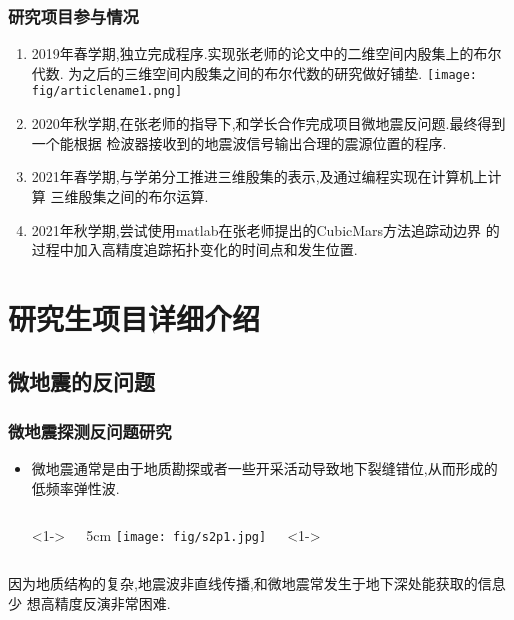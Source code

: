 \documentclass[UTF8]{ctexbeamer}	%
\theoremstyle{plain}
\theoremstyle{definition}
\theoremstyle{remark}
\numberwithin{equation}{section}
\begin{document}
\begin{frame}[fragile]
   \frametitle{研究项目参与情况}
    \small{\begin{enumerate}
        \item 2019年春学期,独立完成程序.实现张老师的论文中的二维空间内殷集上的布尔代数.
        为之后的三维空间内殷集之间的布尔代数的研究做好铺垫.
        \texttt{[image: fig/articlename1.png]}
        \item 2020年秋学期,在张老师的指导下,和学长合作完成项目微地震反问题.最终得到一个能根据
        检波器接收到的地震波信号输出合理的震源位置的程序.
        \item 2021年春学期,与学弟分工推进三维殷集的表示,及通过编程实现在计算机上计算
        三维殷集之间的布尔运算.
        \item 2021年秋学期,尝试使用matlab在张老师提出的CubicMars方法追踪动边界
        的过程中加入高精度追踪拓扑变化的时间点和发生位置.
    \end{enumerate}}
\end{frame}

\section{研究生项目详细介绍}
\subsection{微地震的反问题}

\begin{frame}[fragile]
    \frametitle{微地震探测反问题研究}
    \begin{itemize}
        \item  微地震通常是由于地质勘探或者一些开采活动导致地下裂缝错位,从而形成的
        低频率弹性波.
        \begin{columns}
            <1->
            \begin{wrapfigure}[r]{5cm}
                \centering
                \texttt{[image: fig/s2p1.jpg]}
            \end{wrapfigure}    
            <1->
        \end{columns}
    \end{itemize}
    \item 因为地质结构的复杂,地震波非直线传播,和微地震常发生于地下深处能获取的信息少
    想高精度反演非常困难. 
\end{frame}
\end{document}
